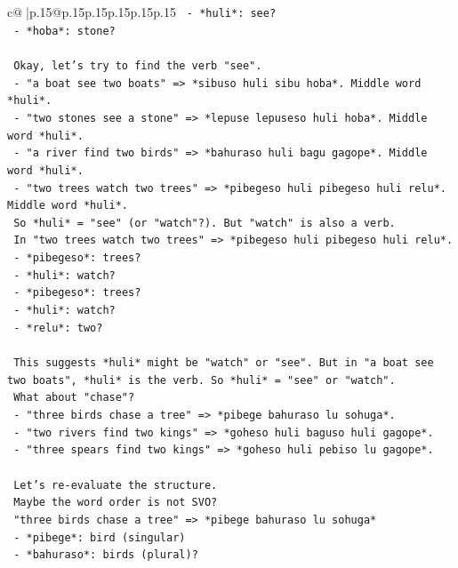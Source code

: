 \documentclass{article}
\begin{document}
{\begin{supertabular}{c@{$\;$}|p{.15\linewidth}@{}p{.15\linewidth}p{.15\linewidth}p{.15\linewidth}p{.15\linewidth}p{.15\linewidth}}
{{{\texttt{   {-} *huli*: see?} \\
\texttt{   {-} *hoba*: stone?} \\
\\ 
\texttt{   Okay, let's try to find the verb "see".} \\
\texttt{   {-} "a boat see two boats" => *sibuso huli sibu hoba*. Middle word *huli*.} \\
\texttt{   {-} "two stones see a stone" => *lepuse lepuseso huli hoba*. Middle word *huli*.} \\
\texttt{   {-} "a river find two birds" => *bahuraso huli bagu gagope*. Middle word *huli*.} \\
\texttt{   {-} "two trees watch two trees" => *pibegeso huli pibegeso huli relu*. Middle word *huli*.} \\
\texttt{   So *huli* = "see" (or "watch"?). But "watch" is also a verb.} \\
\texttt{   In "two trees watch two trees" => *pibegeso huli pibegeso huli relu*.} \\
\texttt{   {-} *pibegeso*: trees?} \\
\texttt{   {-} *huli*: watch?} \\
\texttt{   {-} *pibegeso*: trees?} \\
\texttt{   {-} *huli*: watch?} \\
\texttt{   {-} *relu*: two?} \\
\\ 
\texttt{   This suggests *huli* might be "watch" or "see". But in "a boat see two boats", *huli* is the verb. So *huli* = "see" or "watch".} \\
\texttt{   What about "chase"?} \\
\texttt{   {-} "three birds chase a tree" => *pibege bahuraso lu sohuga*.} \\
\texttt{   {-} "two rivers find two kings" => *goheso huli baguso huli gagope*.} \\
\texttt{   {-} "three spears find two kings" => *goheso huli pebiso lu gagope*.} \\
\\ 
\texttt{   Let's re{-}evaluate the structure.} \\
\texttt{   Maybe the word order is not SVO?} \\
\texttt{   "three birds chase a tree" => *pibege bahuraso lu sohuga*} \\
\texttt{   {-} *pibege*: bird (singular)} \\
\texttt{   {-} *bahuraso*: birds (plural)?} \\
}}}
\end{supertabular}}
\end{document}
